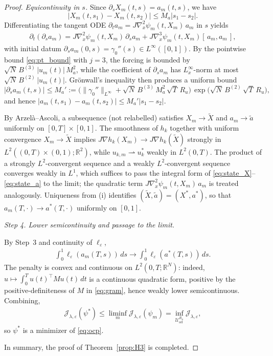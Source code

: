 \documentclass[12pt, reqno]{amsart}
\theoremstyle{plain}
\theoremstyle{definition}
\numberwithin{equation}{section}
\numberwithin{figure}{section}
\numberwithin{algorithm}{section}
\begin{document}
\begin{proof}
\emph{Equicontinuity in $s$.} Since $\partial_s X_m(t,s)=a_m(t,s)$, we have $$|X_m(t,s_1)-X_m(t,s_2)| \le M_a|s_1-s_2|.$$ Differentiating the tangent ODE $\partial_t a_m=J\nabla_x^2\psi_m(t,X_m)\,a_m$ in $s$ yields
\begin{align*}
\partial_t(\partial_s a_m)
=J\nabla_x^2\psi_m(t,X_m)\,\partial_s a_m
+J\nabla_x^3\psi_m(t,X_m)[\,a_m,a_m\,],
\end{align*}
with initial datum $\partial_s a_m(0,s)=\gamma_0''(s)\in L^\infty([0,1])$. By the pointwise bound \eqref{eq:pt_bound} with $j=3$, the forcing is bounded by $\sqrt N\,B^{(3)}\,|u_m(t)|\,M_a^2$, while the coefficient of $\partial_s a_m$ has $L^\infty_x$-norm at most $\sqrt N\,B^{(2)}\,|u_m(t)|$. Gr\"onwall's inequality then produces a uniform bound
\begin{equation}\label{eq:Map}
|\partial_s a_m(t,s)|\le M_a':=\bigl(\|\gamma_0''\|_{L^\infty}+\sqrt N\,B^{(3)}\,M_a^2\,\sqrt T\,R_u\bigr)\,\exp\!\bigl(\sqrt N\,B^{(2)}\,\sqrt T\,R_u\bigr),
\end{equation}
and hence $|a_m(t,s_1)-a_m(t,s_2)|\le M_a'|s_1-s_2|$.

By Arzel\`a--Ascoli, a subsequence (not relabelled) satisfies $X_m\to\widetilde X$ and $a_m\to\widetilde a$ uniformly on $[0,T]\times[0,1]$. The smoothness of $h_k$ together with uniform convergence $X_m\to\widetilde X$ implies $J\nabla h_k(X_m)\to J\nabla h_k(\widetilde X)$ strongly in $L^2((0,T)\times(0,1);\mathbb R^2)$, while $u_{k,m}\rightharpoonup u^*_k$ weakly in $L^2(0,T)$. The product of a strongly $L^2$-convergent sequence and a weakly $L^2$-convergent sequence converges weakly in $L^1$, which suffices to pass the integral form of \eqref{eq:state_X}--\eqref{eq:state_a} to the limit; the quadratic term $J\nabla_x^2\psi_m(t,X_m)\,a_m$ is treated analogously. Uniqueness from (i) identifies $(\widetilde X,\widetilde a)=(X^*,a^*)$, so that $a_m(T,\cdot)\to a^*(T,\cdot)$ uniformly on $[0,1]$.

\vskip 5pt
\noindent\textit{Step 4. Lower semicontinuity and passage to the limit.}

By Step~3 and continuity of $\ell_\varepsilon$,
\begin{align*}
\int_0^1\ell_\varepsilon(a_m(T,s))\,ds\longrightarrow\int_0^1\ell_\varepsilon(a^*(T,s))\,ds.
\end{align*}
The penalty is convex and continuous on $L^2(0,T;\mathbb R^N)$: indeed, $u\mapsto\int_0^T u(t)^\top M u(t)\,dt$ is a continuous quadratic form, positive by the positive-definiteness of $M$ in \eqref{eq:gram}, hence weakly lower semicontinuous. Combining,
\begin{align*}
\mathcal J_{\lambda,\varepsilon}(\psi^*)\le\liminf_m\mathcal J_{\lambda,\varepsilon}(\psi_m)=\inf_{\mathcal U_{\mathrm{ad}}^{R_u}}\mathcal J_{\lambda,\varepsilon},
\end{align*}
so $\psi^*$ is a minimizer of \eqref{eq:ocp}.

\vskip 5pt
In summary, the proof of Theorem~\ref{prop:H3} is completed.
\end{proof}
\end{document}
